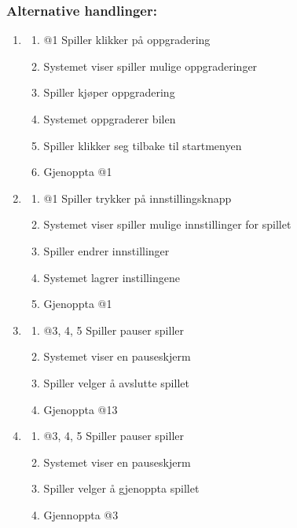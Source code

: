 \documentclass[12pt]{report}
\begin{document}
\subsubsection*{Alternative handlinger:}
\begin{enumerate}[label=\Alph*]
\item 
\bigskip
\begin{enumerate}
\item @1 Spiller klikker p{\aa} oppgradering
\item Systemet viser spiller mulige oppgraderinger 
\item Spiller kj{\o}per oppgradering
\item Systemet oppgraderer bilen
\item Spiller klikker seg tilbake til startmenyen
\item Gjenoppta @1
\end{enumerate}
\item 
\bigskip
\begin{enumerate}
\item @1 Spiller trykker p{\aa} innstillingsknapp
\item Systemet viser spiller mulige innstillinger for spillet
\item Spiller endrer innstillinger
\item Systemet lagrer instillingene
\item Gjenoppta @1
\end{enumerate}
\item
\bigskip
\begin{enumerate}
\item @3, 4, 5 Spiller pauser spiller
\item Systemet viser en pauseskjerm
\item Spiller velger {\aa} avslutte spillet
\item Gjenoppta @13
\end{enumerate}
\item
\bigskip
\begin{enumerate}
\item @3, 4, 5 Spiller pauser spiller
\item Systemet viser en pauseskjerm
\item Spiller velger {\aa} gjenoppta spillet
\item Gjennoppta @3
\end{enumerate}
\end{enumerate}
\pagebreak
\end{document}
